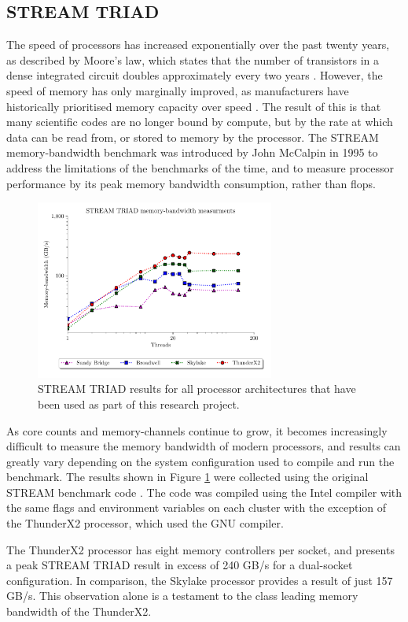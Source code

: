 \documentclass[a4paper,11pt]{report}
\begin{document}
\subsection{STREAM TRIAD}
The speed of processors has increased exponentially over the past twenty years, as described by Moore's law, which states that the number of transistors in a dense integrated circuit doubles approximately every two years  \cite{moore1965cramming}. However, the speed of memory has only marginally improved, as manufacturers have historically prioritised memory capacity over speed \cite{mccalpin1995memory,patterson1997case}. The result of this is that many scientific codes are no longer bound by compute, but by the rate at which data can be read from, or stored to memory by the processor. The STREAM memory-bandwidth benchmark was introduced by John McCalpin in 1995 to address the limitations of the benchmarks of the time, and to measure processor performance by its peak memory bandwidth consumption, rather than \gls{flops}.
\begin{figure}[htbp]
\begin{center}
\includegraphics[width=0.7\textwidth]{img/stream-triad.pdf}
\caption[STREAM TRIAD benchmark]{STREAM TRIAD results for all processor architectures that have been used as part of this research project. }
\label{fig:bandwidth}
\end{center}
\end{figure}
\par 
As core counts and memory-channels continue to grow, it becomes increasingly difficult to measure the memory bandwidth of modern processors, and results can greatly vary depending on the system configuration used to compile and run the benchmark. The results shown in Figure \ref{fig:bandwidth} were collected using the original STREAM benchmark code \cite{stream2019github}. The code was compiled using the Intel compiler with the same flags and environment variables on each cluster with the exception of the ThunderX2 processor, which used the GNU compiler. 
\par
The ThunderX2 processor has eight memory controllers per socket, and presents a peak STREAM TRIAD result in excess of 240 GB/s for a dual-socket configuration. In comparison, the Skylake processor provides a result of just 157 GB/s. This observation alone is a testament to the class leading memory bandwidth of the ThunderX2.
\end{document}
